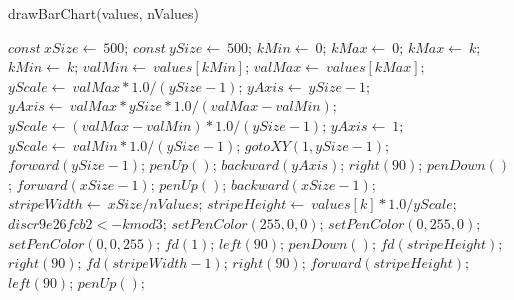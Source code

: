 \documentclass[a4paper,10pt]{article}
\begin{document}
\begin{algorithm}
\caption{drawBarChart(values, nValues)}
\begin{algorithmic}[5]

\STATE {}
\STATE {}
\STATE {}
\STATE {}
  \STATE \(const\ xSize\gets\ 500\);
  \STATE \(const\ ySize\gets\ 500\);
  \STATE \(kMin\gets\ 0\);
  \STATE \(kMax\gets\ 0\);
      \STATE \(kMax\gets\ k\);
    \ELSE
        \STATE \(kMin\gets\ k\);
      \ENDIF
    \ENDIF
  \ENDFOR
  \STATE \(valMin\gets\ values[kMin]\);
  \STATE \(valMax\gets\ values[kMax]\);
  \STATE \(yScale\gets\ valMax*1.0/(ySize-1)\);
  \STATE \(yAxis\gets\ ySize-1\);
      \STATE \(yAxis\gets\ valMax*ySize*1.0/(valMax-valMin)\);
      \STATE \(yScale\gets(valMax-valMin)*1.0/(ySize-1)\);
    \ELSE
      \STATE \(yAxis\gets\ 1\);
      \STATE \(yScale\gets\ valMin*1.0/(ySize-1)\);
    \ENDIF
  \ENDIF
  \STATE \(gotoXY(1,ySize-1)\);
  \STATE \(forward(ySize-1)\);
  \STATE \(penUp()\);
  \STATE \(backward(yAxis)\);
  \STATE \(right(90)\);
  \STATE \(penDown()\);
  \STATE \(forward(xSize-1)\);
  \STATE \(penUp()\);
  \STATE \(backward(xSize-1)\);
  \STATE \(stripeWidth\gets\ xSize/nValues\);
    \STATE \(stripeHeight\gets\ values[k]*1.0/yScale\);
    \STATE \(discr9e26fcb2 <- k mod 3\);
      \STATE \(setPenColor(255,0,0)\);
      \STATE \(setPenColor(0,255,0)\);
      \STATE \(setPenColor(0,0,255)\);
    \ENDIF
    \STATE \(fd(1)\);
    \STATE \(left(90)\);
    \STATE \(penDown()\);
    \STATE \(fd(stripeHeight)\);
    \STATE \(right(90)\);
    \STATE \(fd(stripeWidth-1)\);
    \STATE \(right(90)\);
    \STATE \(forward(stripeHeight)\);
    \STATE \(left(90)\);
    \STATE \(penUp()\);
  \ENDFOR

\end{algorithmic}
\end{algorithm}
\end{document}
